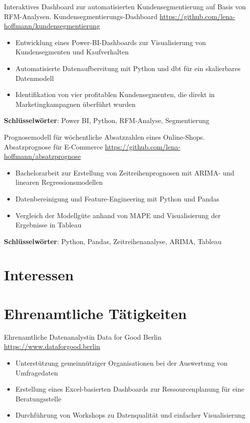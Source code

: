 \documentclass[a4paper, serif, 10pt]{moderncv}
\begin{document}
        {Interaktives Dashboard zur automatisierten Kundensegmentierung auf Basis von RFM-Analysen.}
        {Kundensegmentierungs-Dashboard}
        {\url{https://github.com/lena-hoffmann/kundensegmentierung}}
        {}
        {\begin{itemize}
\item Entwicklung eines Power-BI-Dashboards zur Visualisierung von Kundensegmenten und Kaufverhalten
\item Automatisierte Datenaufbereitung mit Python und dbt für ein skalierbares Datenmodell
\item Identifikation von vier profitablen Kundensegmenten, die direkt in Marketingkampagnen überführt wurden
\end{itemize}
\textbf{Schlüsselwörter}: Power BI, Python, RFM-Analyse, Segmentierung}

        {Prognosemodell für wöchentliche Absatzzahlen eines Online-Shops.}
        {Absatzprognose für E-Commerce}
        {\url{https://github.com/lena-hoffmann/absatzprognose}}
        {}
        {\begin{itemize}
\item Bachelorarbeit zur Erstellung von Zeitreihenprognosen mit ARIMA- und linearen Regressionsmodellen
\item Datenbereinigung und Feature-Engineering mit Python und Pandas
\item Vergleich der Modellgüte anhand von MAPE und Visualisierung der Ergebnisse in Tableau
\end{itemize}
\textbf{Schlüsselwörter}: Python, Pandas, Zeitreihenanalyse, ARIMA, Tableau}
\section{Interessen}

\section{Ehrenamtliche Tätigkeiten}

        {Ehrenamtliche Datenanalystin}
        {Data for Good Berlin}
        {\url{https://www.dataforgood.berlin}}
        {}
        {\begin{itemize}
\item Unterstützung gemeinnütziger Organisationen bei der Auswertung von Umfragedaten
\item Erstellung eines Excel-basierten Dashboards zur Ressourcenplanung für eine Beratungsstelle
\item Durchführung von Workshops zu Datenqualität und einfacher Visualisierung
\end{itemize}}
\end{document}
